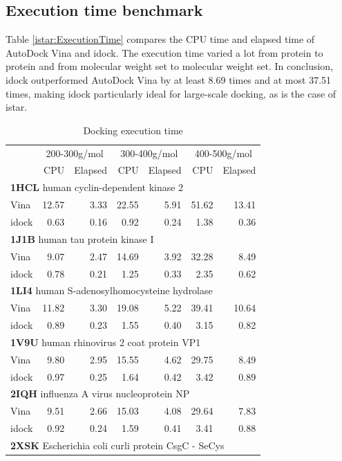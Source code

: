 \subsection{Execution time benchmark}

Table \ref{istar:ExecutionTime} compares the CPU time and elapsed time of AutoDock Vina and idock. The execution time varied a lot from protein to protein and from molecular weight set to molecular weight set. In conclusion, idock outperformed AutoDock Vina by at least 8.69 times and at most 37.51 times, making idock particularly ideal for large-scale docking, as is the case of istar.

\begin{table}
\caption{Docking execution time}
\begin{tabular}{lrrrrrr}
\hline
& \multicolumn{2}{c}{200-300g/mol} & \multicolumn{2}{c}{300-400g/mol} & \multicolumn{2}{c}{400-500g/mol}\\
& CPU & Elapsed & CPU & Elapsed & CPU & Elapsed\\
\hline
\multicolumn{7}{l}{\textbf{1HCL} human cyclin-dependent kinase 2}\\
Vina  & 12.57 &  3.33 & 22.55 &  5.91 & 51.62 & 13.41\\
idock &  0.63 &  0.16 &  0.92 &  0.24 &  1.38 &  0.36\\
\multicolumn{7}{l}{\textbf{1J1B} human tau protein kinase I}\\
Vina  &  9.07 &  2.47 & 14.69 &  3.92 & 32.28 &  8.49\\
idock &  0.78 &  0.21 &  1.25 &  0.33 &  2.35 &  0.62\\
\multicolumn{7}{l}{\textbf{1LI4} human S-adenosylhomocysteine hydrolase}\\
Vina  & 11.82 &  3.30 & 19.08 &  5.22 & 39.41 & 10.64\\
idock &  0.89 &  0.23 &  1.55 &  0.40 &  3.15 &  0.82\\
\multicolumn{7}{l}{\textbf{1V9U} human rhinovirus 2 coat protein VP1}\\
Vina  &  9.80 &  2.95 & 15.55 &  4.62 & 29.75 &  8.49\\
idock &  0.97 &  0.25 &  1.64 &  0.42 &  3.42 &  0.89\\
\multicolumn{7}{l}{\textbf{2IQH} influenza A virus nucleoprotein NP}\\
Vina  &  9.51 &  2.66 & 15.03 &  4.08 & 29.64 &  7.83\\
idock &  0.92 &  0.24 &  1.59 &  0.41 &  3.41 &  0.88\\
\multicolumn{7}{l}{\textbf{2XSK} Escherichia coli curli protein CsgC - SeCys}\\

\end{tabular}
\end{table}
